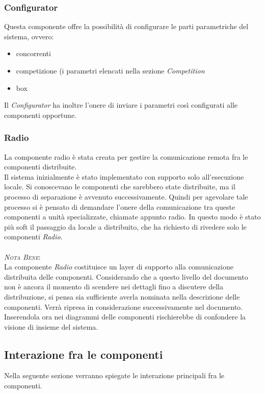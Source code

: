 \subsubsection{Configurator}
Questa componente offre la possibilit\`{a} di configurare le parti parametriche del sistema, ovvero:
\begin{itemize}
	\item concorrenti 
	\item competizione (i parametri elencati nella sezione \emph{Competition}
	\item box
\end{itemize}
Il \emph{Configurator} ha inoltre l'onere di inviare i parametri cos\`{i} configurati alle componenti opportune.

 \subsubsection{Radio}
La componente radio \`{e} stata creata per gestire la comunicazione remota fra le componenti distribuite.\\
Il sistema inizialmente \`{e} stato implementato con supporto solo all'esecuzione locale. Si conoscevano le componenti che sarebbero state distribuite,
ma il processo di separazione \`{e} avvenuto successivamente. Quindi per agevolare tale processo si \`{e} pensato di demandare l'onere della comunicazione 
tra queste componenti a unit\`{a} specializzate, chiamate appunto radio. In questo modo \`{e} stato pi\`{u} soft il passaggio da locale a distribuito,
che ha richiesto di rivedere solo le componenti \emph{Radio}.\\\\
\emph{\textsc{Nota Bene}}:\\
La componente \emph{Radio} costituisce un layer di supporto alla comunicazione 
distribuita delle componenti. Considerando che a questo livello del documento non \`{e} ancora il momento di scendere nei dettagli fino a discutere 
della distribuzione, si pensa sia sufficiente averla nominata nella descrizione delle componenti. Verr\`{a} ripresa
in considerazione successivamente nel documento. Inserendola ora nei diagrammi delle componenti rischierebbe di confondere la visione di insieme
del sistema.
\subsection{Interazione fra le componenti}
Nella seguente sezione verranno spiegate le interazione principali fra le componenti.\\\\
